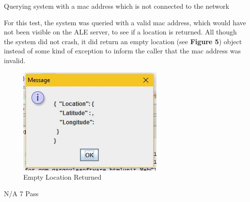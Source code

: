 \FuncReq
{Querying system with a mac address which is not connected to the network}
{For this test, the system was queried with a valid mac address, which would have not been visible on the ALE server, to see if a location is returned. All though the system did not crash, it did return an empty location (see \textbf{Figure 5}) object instead of some kind of exception to inform the caller that the mac address was invalid.
			\begin{figure}[h]
				\centering
				\includegraphics{functional/images/wrong_mac.jpg}
				\caption{Empty Location Returned}
				\label{fig:LocationReturned}
			\end{figure}
}
{N/A}
{7}
{Pass}